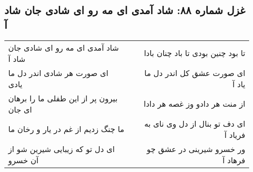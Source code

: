 \begin{center}
\section*{غزل شماره ۸۸: شاد آمدی ای مه رو ای شادی جان شاد آ}
\label{sec:0088}
\begin{longtable}{l p{0.5cm} r}
شاد آمدی ای مه رو ای شادی جان شاد آ
&&
تا بود چنین بودی تا باد چنان بادا
\\
ای صورت هر شادی اندر دل ما یادی
&&
ای صورت عشق کل اندر دل ما یاد آ
\\
بیرون پر از این طفلی ما را برهان ای جان
&&
از منت هر دادو وز غصه هر دادا
\\
ما چنگ زدیم از غم در یار و رخان ما
&&
ای دف تو بنال از دل وی نای به فریاد آ
\\
ای دل تو که زیبایی شیرین شو از آن خسرو
&&
ور خسرو شیرینی در عشق چو فرهاد آ
\\
\end{longtable}
\end{center}
